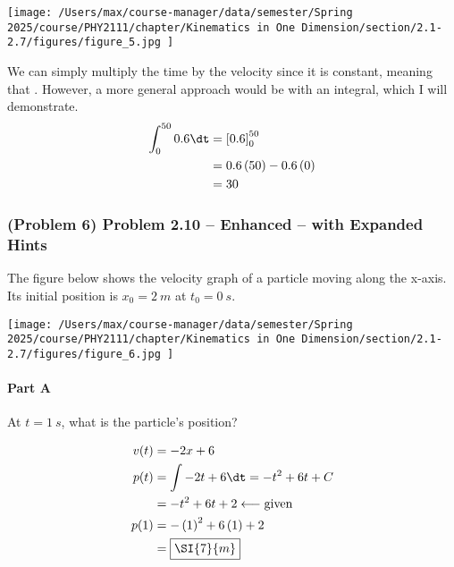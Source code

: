 \begin{center}
	\texttt{[image: /Users/max/course-manager/data/semester/Spring 2025/course/PHY2111/chapter/Kinematics in One Dimension/section/2.1-2.7/figures/figure\_5.jpg
	]}
\end{center}

\begin{solution}
	We can simply multiply the time by the velocity since it is constant, meaning that . However, a more general approach would be with an integral, which I will demonstrate.
	\begin{align*}
		\int_{0}^{50} 0.6 \dt &= \left[ 0.6 \right]_{0}^{50} \\
		&= 0.6\left( 50 \right)-0.6\left( 0 \right) \\
		&= 30
	\end{align*}
\end{solution}

\newpage

\subsubsection{(Problem 6) Problem 2.10 -- Enhanced -- with Expanded Hints}

The figure below shows the velocity graph of a particle moving along the x-axis. Its initial position is $x_0 = \SI{2}{m}$ at $t_0 = \SI{0}{s}$.

\begin{center}
	\texttt{[image: /Users/max/course-manager/data/semester/Spring 2025/course/PHY2111/chapter/Kinematics in One Dimension/section/2.1-2.7/figures/figure\_6.jpg
	]}
\end{center}

\paragraph{Part A}
At $t=\SI{1}{s}$, what is the particle's position?

\begin{solution}
	\begin{align*}
		v(t) &= -2x + 6 \\
		p(t) &= \int -2t + 6 \dt = -t^2 + 6t + C \\
		&= -t^2 + 6t + 2 \longleftarrow \text{given} \\
		p(1) &= -\left( 1 \right)^2 + 6\left( 1 \right) + 2 \\
		&= \boxed{\SI{7}{m}}
	\end{align*}
\end{solution}


